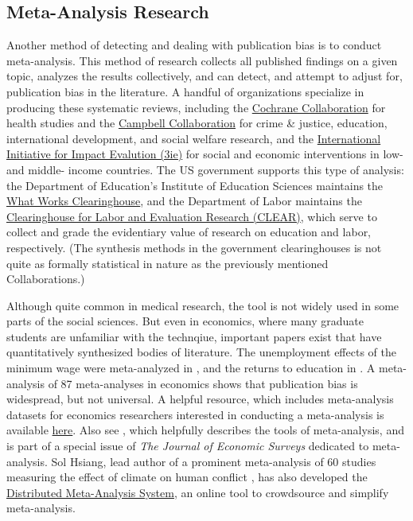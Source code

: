 \documentclass[12pt] {article}
\begin{document}
\subsection{Meta-Analysis Research}
Another method of detecting and dealing with publication bias is to conduct meta-analysis. This method of research collects all published findings on a given topic, analyzes the results collectively, and can detect, and attempt to adjust for, publication bias in the literature. A handful of organizations specialize in producing these systematic reviews, including the \href{http://www.cochrane.org}{Cochrane Collaboration} for health studies and the \href{http://www.campbellcollaboration.org/}{Campbell Collaboration} for crime \& justice, education, international development, and social welfare research, and the \href{http://www.3ie.org}{International Initiative for Impact Evalution (3ie)} for social and economic interventions in low- and middle- income countries. The US government supports this type of analysis: the Department of Education's Institute of Education Sciences maintains the \href{http://ies.ed.gov/ncee/wwc/}{What Works Clearinghouse}, and the Department of Labor maintains the \href{http://clear.dol.gov/}{Clearinghouse for Labor and Evaluation Research (CLEAR)}, which serve to collect and grade the evidentiary value of research on education and labor, respectively. (The synthesis methods in the government clearinghouses is not quite as formally statistical in nature as the previously mentioned Collaborations.)

Although quite common in medical research, the tool is not widely used in some parts of the social sciences. But even in economics, where many graduate students are unfamiliar with the technqiue, important papers exist that have quantitatively synthesized bodies of literature. The unemployment effects of the minimum wage were meta-analyzed in \cite{card1995time}, and the returns to education in \cite{ashenfelter1999review}. A meta-analysis of 87 meta-analyses in economics shows that publication bias is widespread, but not universal. A helpful resource, which includes meta-analysis datasets for economics researchers interested in conducting a meta-analysis is available \href{http://www.deakin.edu.au/business/economics/research/meta-analysis}{here}. Also see \cite{stanley2005beyond}, which helpfully describes the tools of meta-analysis, and is part of a special issue of \textit{The Journal of Economic Surveys} dedicated to meta-analysis. Sol Hsiang, lead author of a prominent meta-analysis of 60 studies measuring the effect of climate on human conflict \citep{hsiang2013climate}, has also developed the \href{http://dmas.berkeley.edu}{Distributed Meta-Analysis System}, an online tool to crowdsource and simplify meta-analysis.
\end{document}
